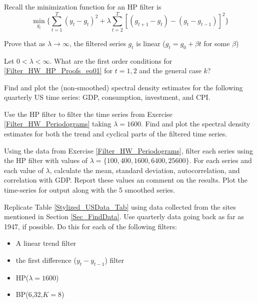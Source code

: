 \documentclass[letterpaper,11pt]{article}
\theoremstyle{definition}
\begin{document}
\begin{spacing}{1.5}
    \begin{Exercise} \label{Filter_HW_HP_Proofs}
        Recall the minimization function for an HP filter is
        \begin{equation}\label{Filter_HW_HP_Proofs_eq01}
        \min_{g_t} \{ \sum_{t=1}^T (y_t - g_t)^2  +\lambda\sum_{t=2}^T[(g_{t+1}-g_{t}) - (g_{t}-g_{t-1})]^2\}
        \end{equation}

        Prove that as $\lambda \rightarrow \infty$, the filtered series $g_t$ is linear ($g_t = g_0 + \beta t$ for some $\beta$)

        Let $0 <\lambda < \infty$. What are the first order conditions for \ref{Filter_HW_HP_Proofs_eq01} for $t = 1, 2$ and the general case $k$?
    \end{Exercise}

    \begin{Exercise} \label{Filter_HW_Periodograms}
        Find and plot the (non-smoothed) spectral density estimates for the following quarterly US time series: GDP, consumption, investment, and CPI.
    \end{Exercise}

    \begin{Exercise} \label{Filter_HW_Periodograms_Filtered}
        Use the HP filter to filter the time series from Exercise \ref{Filter_HW_Periodograms} taking $\lambda = 1600$. Find and plot the spectral density estimates for both the trend and cyclical parts of the filtered time series.
    \end{Exercise}

    \begin{Exercise} \label{Filter_HW_Moments_HP}
        Using the data from Exercise \ref{Filter_HW_Periodograms}, filter each series using the HP filter with values of $\lambda=\{100,400,1600,6400,25600\}$.  For each series and each value of $\lambda$,
        calculate the mean, standard deviation, autocorrelation, and correlation with GDP.  Report these values an comment on the results.  Plot the time-series for output along with the 5 smoothed series.
    \end{Exercise}

    \begin{Exercise} \label{Filter_HW_Moments}
        Replicate Table \ref{Stylized_USData_Tab} using data collected from the sites mentioned in Section \ref{Sec_FindData}.  Use quarterly data going back as far as 1947, if possible.  Do this for each of the following filters:
        \begin{itemize}
          \setlength\itemsep{0em}
          \item A linear trend filter
          \item the first difference ($y_t - y_{t-1}$) filter
          \item HP($\lambda=1600$)
          \item BP(6,32,$K=8$)
        \end{itemize}
    \end{Exercise}

\end{spacing}

\newpage


\end{document}
